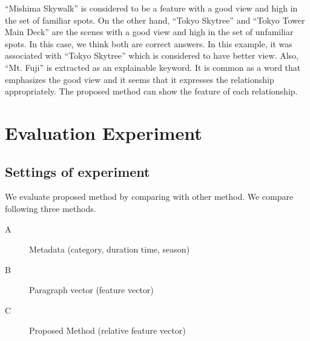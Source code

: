 \documentclass[journal]{IAENGtran}
\begin{document}
``Mishima Skywalk'' is considered to be a feature with a good view and high in the set of familiar spots.
On the other hand, ``Tokyo Skytree'' and ``Tokyo Tower Main Deck'' are the scenes with a good view and high in the set of unfamiliar spots.
In this case, we think both are correct answers.
In this example, it was associated with ``Tokyo Skytree'' which is considered to have better view.
Also, ``Mt. Fuji'' is extracted as an explainable keyword.
It is common as a word that emphasizes the good view and it seems that it expresses the relationship appropriately.
The proposed method can show the feature of each relationship.

\section{Evaluation Experiment}
\label{sec:Evaluation Experiment}
\subsection{Settings of experiment}
\label{subsec:Settings of experiment}
We evaluate proposed method by comparing with other method.
We compare following three methods.
\begin{description}
\item[A]Metadata (category, duration time, season)
\item[B]Paragraph vector (feature vector)
\item[C]Proposed Method (relative feature vector)
\end{description}
\end{document}
